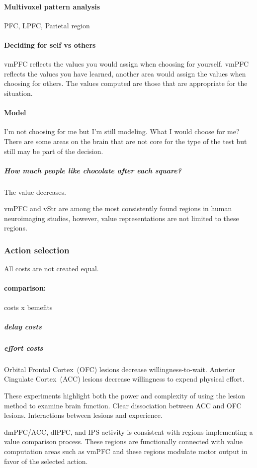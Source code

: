\documentclass[12pt,article,oneside,a4paper]{memoir}
\begin{document}
\paragraph{Multivoxel pattern analysis} PFC, LPFC, Parietal region

\paragraph{Deciding for self vs others}
vmPFC reflects the values you would assign when choosing for yourself.
vmPFC reflects the values you have learned, another area would assign the
values when choosing for others. The values computed are those that are
appropriate for the situation.

\paragraph{Model}
I'm not choosing for me but I'm still modeling. What I would choose for me?
There are some areas on the brain that are not core for the type of the test but
still may be part of the decision.

\subparagraph{How much people like chocolate after each square?}
The value decreases.

vmPFC and vStr are among the most consistently found regions in human
neuroimaging studies, however, value representations are not limited to these
regions.

\subsubsection{Action selection}
All costs are not created equal.

\paragraph{comparison:} costs x bemefits
\subparagraph{delay costs}
\subparagraph{effort costs}

Orbital Frontal Cortex~(OFC) lesions decrease willingness-to-wait. Anterior
Cingulate Cortex~(ACC) lesions decrease willingness to expend physical effort.

These experiments highlight both the power and complexity of using the lesion
method to examine brain function. Clear dissociation between ACC and OFC
lesions. Interactions between lesions and experience.

dmPFC/ACC, dlPFC, and IPS activity is consistent with regions implementing a
value comparison process. These regions are functionally connected with value
computation areas such as vmPFC and these regions modulate motor output in
favor of the selected action.
\end{document}
